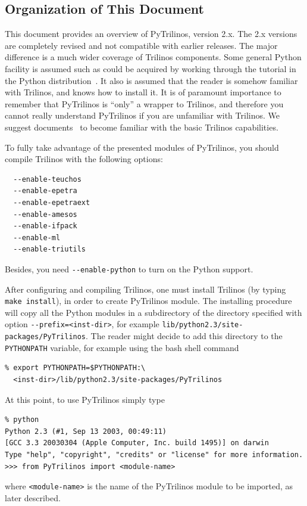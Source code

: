 \documentclass[10pt,relax]{SANDreport}
\newcommand{\PyTrilinos}{{PyTrilinos}}
\begin{document}
\subsection{Organization of This Document}

This document provides an overview of \PyTrilinos, version 2.x.  The 2.x
versions are completely revised and not compatible with earlier releases. The
major difference is a much wider coverage of Trilinos components. Some general
Python facility is assumed such as could be acquired by working through the
tutorial in the Python distribution~\cite{python-tutorial}.  It also is
assumed that the reader is somehow familiar with Trilinos, and knows how to
install it.  It is of paramount importance to remember that PyTrilinos is
``only'' a wrapper to Trilinos, and therefore you cannot really understand
PyTrilinos if you are unfamiliar with Trilinos.  We suggest
documents~\cite{Trilinos-tutorial} to become familiar with the basic Trilinos
capabilities.

To fully take advantage of the presented modules of \PyTrilinos, you should
compile Trilinos with the following options:
\begin{verbatim}
  --enable-teuchos    
  --enable-epetra     
  --enable-epetraext  
  --enable-amesos    
  --enable-ifpack     
  --enable-ml         
  --enable-triutils   
\end{verbatim}
Besides, you need \verb!--enable-python! to turn on the Python support. 

\medskip

After configuring and compiling Trilinos, one must install Trilinos 
(by typing \verb!make install!), in order to create PyTrilinos module.
The installing procedure will copy all the Python modules in a subdirectory of
the directory specified with option \verb!--prefix=<inst-dir>!, for example
\verb!lib/python2.3/site-packages/PyTrilinos!. The reader might decide 
to add this directory to the \verb!PYTHONPATH! variable, for example using the 
bash shell command
\begin{verbatim}
% export PYTHONPATH=$PYTHONPATH:\
  <inst-dir>/lib/python2.3/site-packages/PyTrilinos
\end{verbatim}

At this point, to use PyTrilinos  simply type
\begin{verbatim}
% python
Python 2.3 (#1, Sep 13 2003, 00:49:11) 
[GCC 3.3 20030304 (Apple Computer, Inc. build 1495)] on darwin
Type "help", "copyright", "credits" or "license" for more information.
>>> from PyTrilinos import <module-name>
\end{verbatim}
where \verb!<module-name>! is the name of the PyTrilinos module to be
imported, as later described.
\end{document}
